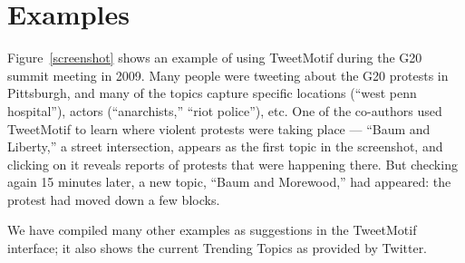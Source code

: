 \documentclass[letterpaper]{article}
\newcommand{\mikeyk}[1]{\textcolor{green}{\textbf{[#1 --mikeyk]}}}
\begin{document}


\section{Examples}

Figure~\ref{screenshot} shows an example of using TweetMotif during the G20 summit meeting in 2009.  Many people were tweeting about the G20 protests in Pittsburgh, and many of the topics capture specific locations (``west penn hospital''), actors (``anarchists,'' ``riot police''), etc.  One of the co-authors used TweetMotif to learn where violent protests were taking place --- ``Baum and Liberty,'' a street intersection, appears as the first topic in the screenshot, and clicking on it reveals reports of protests that were happening there.  But checking again 15 minutes later, a new topic,  ``Baum and Morewood,'' had appeared: the protest had moved down a few blocks.

We have compiled many other examples as suggestions in the TweetMotif interface; it also shows the current Trending Topics as provided by Twitter.





%
%
%
%
%
%
%
%
%
%



%
\end{document}
